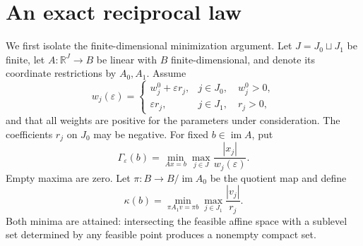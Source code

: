 \documentclass[11pt,a4paper]{article}
\numberwithin{equation}{section}
\theoremstyle{remark}
\newcommand{\R}{\mathbb R}
\newcommand{\im}{\operatorname{im}}
\begin{document}
\section{An exact reciprocal law}\label{sec:reciprocal}
We first isolate the finite-dimensional minimization argument. Let $J=J_0\sqcup J_1$ be finite, let $A:\R^J\to B$ be linear with $B$ finite-dimensional, and denote its coordinate restrictions by $A_0,A_1$. Assume
\begin{equation}\label{eq:weights}
 w_j(\varepsilon)=
 \begin{cases}
 w_j^0+\varepsilon r_j,&j\in J_0,\quad w_j^0>0,\\
 \varepsilon r_j,&j\in J_1,\quad r_j>0,
 \end{cases}
\end{equation}
and that all weights are positive for the parameters under consideration. The coefficients $r_j$ on $J_0$ may be negative. For fixed $b\in\im A$, put
\begin{equation}\label{eq:minimum}
 \Gamma_\varepsilon(b)=\min_{Ax=b}\max_{j\in J}\frac{|x_j|}{w_j(\varepsilon)}.
\end{equation}
Empty maxima are zero. Let $\pi:B\to B/\im A_0$ be the quotient map and define
\begin{equation}\label{eq:coefficient}
 \kappa(b)=\min_{\pi A_1v=\pi b}\max_{j\in J_1}\frac{|v_j|}{r_j}.
\end{equation}
Both minima are attained: intersecting the feasible affine space with a sublevel set determined by any feasible point produces a nonempty compact set.
\end{document}
